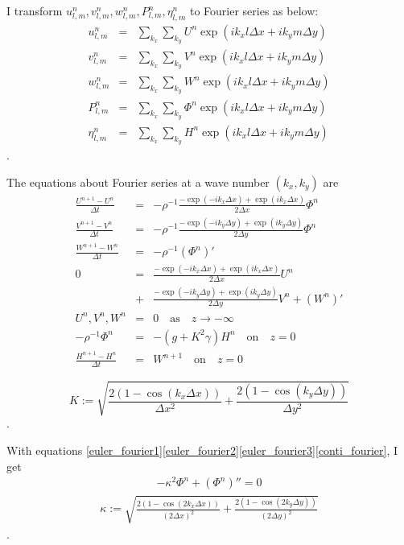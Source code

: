 \documentclass[a4paper,11pt]{article}
\newcommand{\as}{\quad\mathrm{as}\quad}
\newcommand{\on}{\quad\mathrm{on}\quad}
\begin{document}
I transform $u^n_{l,m}, v^n_{l,m}, w^n_{l,m}, P^n_{l,m}, \eta^n_{l,m}$ to Fourier series as below: 
\begin{eqnarray}
u^n_{l,m} &=& \sum_{k_x}\sum_{k_y} U^n\exp(ik_x
 l\Delta x + ik_y m\Delta y) \\
v^n_{l,m} &=& \sum_{k_x}\sum_{k_y} V^n\exp(ik_x
l\Delta x + ik_y m\Delta y) \\
w^n_{l,m} &=& \sum_{k_x}\sum_{k_y} W^n\exp(ik_x
 l\Delta x + ik_y m\Delta y) \\
P^n_{l,m} &=& \sum_{k_x}\sum_{k_y} \Phi^n\exp(ik_x l\Delta x +
 ik_y m\Delta y) \\
\eta^n_{l,m} &=& \sum_{k_x}\sum_{k_y} H^n\exp(ik_x l\Delta x + ik_y m\Delta y)
\end{eqnarray}
.

The equations about Fourier series at a wave number $(k_x, k_y)$ are
\begin{eqnarray}
\frac{U^{n+1}-U^{n}}{\Delta t} &=&
 - \rho^{-1}\frac{- \exp(-i k_x \Delta x) +
 \exp(i k_x \Delta x)}{2\Delta x} \Phi^n
 \label{euler_fourier1} \\
\frac{V^{n+1}-V^{n}}{\Delta t} &=& 
 -\rho^{-1}\frac{-\exp(-i k_y \Delta y) +
 \exp(i k_y \Delta y)}{2\Delta y} \Phi^n
  \label{euler_fourier2} \\
\frac{W^{n+1}-W^{n}}{\Delta t} &=& -\rho^{-1}(\Phi^n)'  \label{euler_fourier3} \\
 0 &=&\frac{- \exp(- i k_x \Delta x) + \exp(i k_x \Delta x)}{2\Delta x}U^n \nonumber\\
&+& \frac{-\exp(- i k_y \Delta y) + \exp(i k_y \Delta y)}{2\Delta y}V^n+(W^n)' \label{conti_fourier} \\
U^n,V^n,W^n &=& 0 \as z \to -\infty \label{bc_bottom_fourier}\\
- \rho^{-1}\Phi^n &=& - (g + K^2 \gamma) H^n \on
 z=0\label{dbc_bottom_fourier} \\
\frac{H^{n+1} - H^n}{\Delta t} &=& W^{n+1} \on z=0 \label{kbc_bottom_fourier}
\end{eqnarray}

\begin{equation}
K := \sqrt{\frac{2(1-\cos (k_x \Delta x))}{\Delta x^2}
          + \frac{2(1-\cos (k_y \Delta y))}{\Delta y^2}}
\end{equation}
.

With equations \eqref{euler_fourier1}\eqref{euler_fourier2}\eqref{euler_fourier3}\eqref{conti_fourier}, I get
\begin{eqnarray}
-\kappa^2 \Phi^n + (\Phi^n)'' = 0
\end{eqnarray}
\begin{eqnarray}
\kappa := \sqrt{\frac{2(1-\cos (2k_x \Delta x))}{(2\Delta x)^2}
         + \frac{2(1-\cos (2k_y \Delta y))}{(2\Delta y)^2}}
\end{eqnarray}
.
\end{document}
